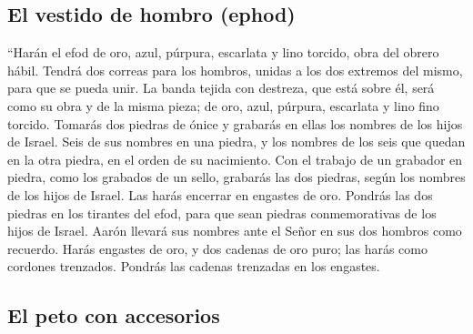 \begin{paracol}{2}
\hypertarget{el-vestido-de-hombro-ephod}{%
\subsection{El vestido de hombro
(ephod)}\label{el-vestido-de-hombro-ephod}}

 ``Harán el efod de oro, azul, púrpura, escarlata y lino
torcido, obra del obrero hábil.  Tendrá dos correas para
los hombros, unidas a los dos extremos del mismo, para que se pueda
unir.  La banda tejida con destreza, que está sobre él,
será como su obra y de la misma pieza; de oro, azul, púrpura, escarlata
y lino fino torcido.  Tomarás dos piedras de ónice y
grabarás en ellas los nombres de los hijos de Israel. 
Seis de sus nombres en una piedra, y los nombres de los seis que quedan
en la otra piedra, en el orden de su nacimiento.  Con el
trabajo de un grabador en piedra, como los grabados de un sello,
grabarás las dos piedras, según los nombres de los hijos de Israel. Las
harás encerrar en engastes de oro.  Pondrás las dos
piedras en los tirantes del efod, para que sean piedras conmemorativas
de los hijos de Israel. Aarón llevará sus nombres ante el Señor en sus
dos hombros como recuerdo.  Harás engastes de oro,
 y dos cadenas de oro puro; las harás como cordones
trenzados. Pondrás las cadenas trenzadas en los engastes.

\hypertarget{el-peto-con-accesorios}{%
\subsection{El peto con accesorios}\label{el-peto-con-accesorios}}


\end{paracol}
